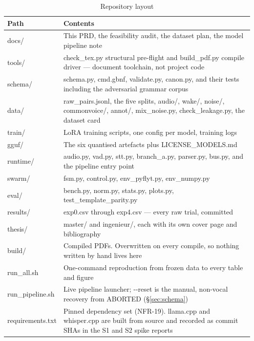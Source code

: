 \documentclass[11pt,a4paper]{article}
\newcommand{\code}[1]{{\ttfamily\small #1}}
\begin{document}
\begin{table}[htbp]
\centering
\caption{Repository layout}
\label{tab:repo}
\small
\begin{tabular}{@{}P{0.24}P{0.66}@{}}
\toprule
\textbf{Path} & \textbf{Contents} \\
\midrule
\code{docs/}    & This PRD, the feasibility audit, the dataset plan, the model pipeline note \\
\code{tools/}   & \code{check\_tex.py} structural pre-flight and \code{build\_pdf.py} compile driver ---
                  document toolchain, not project code \\
\code{schema/}  & \code{schema.py}, \code{cmd.gbnf}, \code{validate.py}, \code{canon.py}, and their tests
                  including the adversarial grammar corpus \\
\code{data/}    & \code{raw\_pairs.jsonl}, the five splits, \code{audio/}, \code{wake/}, \code{noise/},
                  \code{commonvoice/}, \code{annot/}, \code{mix\_noise.py}, \code{check\_leakage.py},
                  the dataset card \\
\code{train/}   & LoRA training scripts, one config per model, training logs \\
\code{gguf/}    & The six quantised artefacts plus \code{LICENSE\_MODELS.md} \\
\code{runtime/} & \code{audio.py}, \code{vad.py}, \code{stt.py}, \code{branch\_a.py}, \code{parser.py},
                  \code{bus.py}, and the pipeline entry point \\
\code{swarm/}   & \code{fsm.py}, \code{control.py}, \code{env\_pyflyt.py}, \code{env\_numpy.py} \\
\code{eval/}    & \code{bench.py}, \code{norm.py}, \code{stats.py}, \code{plots.py},
                  \code{test\_template\_parity.py} \\
\code{results/} & \code{exp0.csv} through \code{exp4.csv} --- every raw trial, committed \\
\code{thesis/}  & \code{master/} and \code{ingenieur/}, each with its own cover page and bibliography \\
\code{build/}   & Compiled PDFs. Overwritten on every compile, so nothing written by hand lives here \\
\code{run\_all.sh} & One-command reproduction from frozen data to every table and figure \\
\code{run\_pipeline.sh} & Live pipeline launcher; \code{-{}-reset} is the manual, non-vocal recovery from
                  \code{ABORTED} (\S\ref{sec:schema}) \\
\code{requirements.txt} & Pinned dependency set (NFR-19). \code{llama.cpp} and \code{whisper.cpp} are built
                  from source and recorded as commit SHAs in the S1 and S2 spike reports \\
\bottomrule
\end{tabular}
\end{table}
\end{document}
